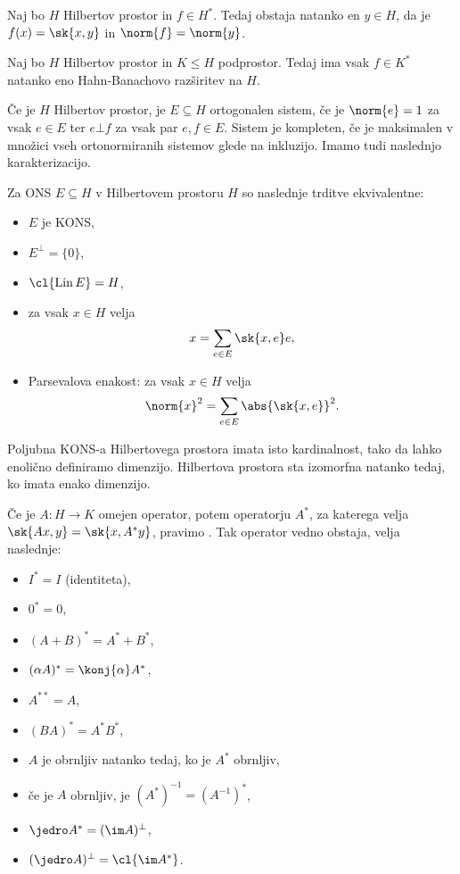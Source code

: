 \begin{izrek}[Riesz]
  Naj bo $H$ Hilbertov prostor in $f \in H^*$.
  Tedaj obstaja natanko en $y \in H$, da je $f(x) = \sk{x,y}$ in $\norm{f} =
  \norm{y}$.
\end{izrek}

\begin{izrek}
  Naj bo $H$ Hilbertov prostor in $K \le H$ podprostor.
  Tedaj ima vsak $f \in K^*$ natanko eno Hahn-Banachovo razširitev na $H$.
\end{izrek}

Če je $H$ Hilbertov prostor, je $E \subseteq H$ ortogonalen sistem, če je
$\norm{e} = 1$ za vsak $e \in E$ ter $e \bot f$ za vsak par $e,f \in E$.
Sistem je kompleten, če je maksimalen v množici vseh ortonormiranih sistemov
glede na inkluzijo.
Imamo tudi naslednjo karakterizacijo.

\begin{izrek}
  Za ONS $E \subseteq H$ v Hilbertovem prostoru $H$ so naslednje trditve
  ekvivalentne:
  \begin{itemize}
  \item $E$ je KONS,
  \item $E^\bot = \{0\}$,
  \item $\cl{\operatorname{Lin} E} = H$,
  \item za vsak $x \in H$ velja
	\[
	  x = \sum_{e \in E} \sk{x,e} e,
	\]
  \item Parsevalova enakost: za vsak $x \in H$ velja
	\[
	  \norm{x}^2 = \sum_{e \in E} \abs{\sk{x,e}}^2.
	\]
  \end{itemize}
\end{izrek}

Poljubna KONS-a Hilbertovega prostora imata isto kardinalnost, tako da lahko
enolično definiramo dimenzijo.
Hilbertova prostora sta izomorfna natanko tedaj, ko imata enako dimenzijo.


Če je $A: H \to K$ omejen operator, potem operatorju $A^*$, za katerega velja
$\sk{Ax,y} = \sk{x, A^*y}$, pravimo .
Tak operator vedno obstaja, velja naslednje:
\begin{itemize}
\item $I^* = I$ (identiteta),
\item $0^* = 0$,
\item $(A+B)^* = A^* + B^*$,
\item $(\alpha A)^* = \konj{\alpha} A^*$,
\item $A^{**} = A$,
\item $(BA)^* = A^* B^*$,
\item $A$ je obrnljiv natanko tedaj, ko je $A^*$ obrnljiv,
\item če je $A$ obrnljiv, je $(A^*)^{-1} = (A^{-1})^*$,
\item $\jedro A^* = (\im A)^\bot$,
\item $(\jedro A)^\bot = \cl{\im A^*}$.
\end{itemize}

